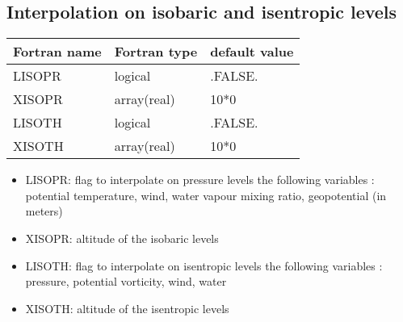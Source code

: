 \subsection{Interpolation on isobaric and isentropic levels}
\begin{center}
\begin{tabular} {|l|l|l|}
\hline
Fortran name  & Fortran type & default value \\
\hline
LISOPR       & logical     & .FALSE.   \\
XISOPR       & array(real) & 10*0  \\
LISOTH       & logical     & .FALSE.   \\
XISOTH       & array(real) & 10*0  \\
\hline
\end{tabular}
\end{center}
\begin{itemize}
\item LISOPR: flag to interpolate on pressure levels the following variables : potential temperature, wind, water vapour mixing ratio, geopotential (in meters)
\item XISOPR: altitude of the isobaric levels
\item LISOTH: flag to interpolate on isentropic levels the following variables : pressure, potential vorticity, wind, water
\item XISOTH: altitude of the isentropic levels
\end{itemize}
